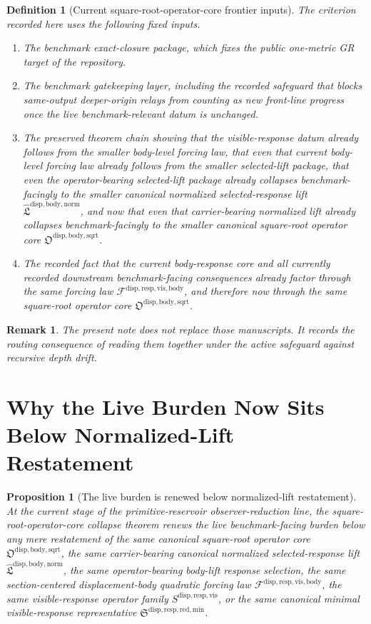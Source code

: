 \documentclass[11pt]{article}
\newcommand{\NormalizedLiftPackage}{\widehat{\mathfrak L}^{\mathrm{disp,body,norm}}}
\newcommand{\SquareRootOperatorCore}{\mathfrak O^{\mathrm{disp,body,sqrt}}}
\newcommand{\VisibleBodyForcingLaw}{\mathscr F^{\mathrm{disp,resp,vis,body}}}
\newcommand{\VisibleResponseOperator}{S^{\mathrm{disp,resp,vis}}}
\newcommand{\MinimalReducedStructure}{\mathfrak S^{\mathrm{disp,resp,red,min}}}
\newtheorem{definition}{Definition}
\newtheorem{proposition}{Proposition}
\newtheorem{remark}{Remark}
\begin{document}
\begin{definition}[Current square-root-operator-core frontier inputs]
The criterion recorded here uses the following fixed inputs.
\begin{enumerate}
    \item The benchmark exact-closure package, which fixes the public one-metric GR target of the repository.
    \item The benchmark gatekeeping layer, including the recorded safeguard that blocks same-output deeper-origin relays from counting as new front-line progress once the live benchmark-relevant datum is unchanged.
    \item The preserved theorem chain showing that the visible-response datum already follows from the smaller body-level forcing law, that even that current body-level forcing law already follows from the smaller selected-lift package, that even the operator-bearing selected-lift package already collapses benchmark-facingly to the smaller canonical normalized selected-response lift \(\NormalizedLiftPackage\), and now that even that carrier-bearing normalized lift already collapses benchmark-facingly to the smaller canonical square-root operator core \(\SquareRootOperatorCore\).
    \item The recorded fact that the current body-response core and all currently recorded downstream benchmark-facing consequences already factor through the same forcing law \(\VisibleBodyForcingLaw\), and therefore now through the same square-root operator core \(\SquareRootOperatorCore\).
\end{enumerate}
\end{definition}

\begin{remark}
The present note does not replace those manuscripts. It records the routing consequence of reading them together under the active safeguard against recursive depth drift.
\end{remark}

\section{Why the Live Burden Now Sits Below Normalized-Lift Restatement}

\begin{proposition}[The live burden is renewed below normalized-lift restatement]
At the current stage of the primitive-reservoir observer-reduction line, the square-root-operator-core collapse theorem renews the live benchmark-facing burden below any mere restatement of the same canonical square-root operator core \(\SquareRootOperatorCore\), the same carrier-bearing canonical normalized selected-response lift \(\NormalizedLiftPackage\), the same operator-bearing body-lift response selection, the same section-centered displacement-body quadratic forcing law \(\VisibleBodyForcingLaw\), the same visible-response operator family \(\VisibleResponseOperator\), or the same canonical minimal visible-response representative \(\MinimalReducedStructure\).
\end{proposition}
\end{document}
